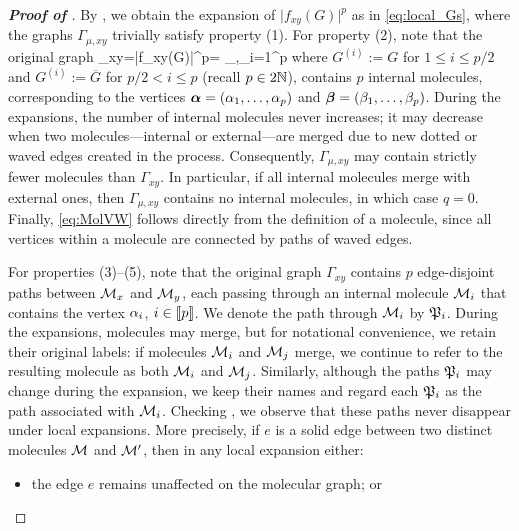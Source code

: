 \begin{proof}[\bf Proof of ]
By , we obtain the expansion of $\big|f_{xy}(G)\big|^{p}$ as in \eqref{eq:local_Gs}, where the graphs $\Gamma_{\mu,xy}$ trivially satisfy property (1). For property (2), note that the original graph 
\be\label{eq:originGamma}\Gamma_{xy}=\big|f_{xy}(G)\big|^{p}= \sum_{\bal,\bbeta}\prod_{i=1}^p \ee
where $G^{(i)}:=G$ for $1\le i\le p/2$ and $G^{(i)}:=\overline{G}$ for $p/2< i\le p$ (recall $p\in 2\N$), contains $p$ internal molecules, corresponding to the vertices $\bal=(\al_1,\ldots, \al_p)$ and $\bbeta=(\beta_1,\ldots, \beta_p)$. During the expansions, the number of internal molecules never increases; it may decrease when two molecules---internal or external---are merged due to new dotted or waved edges created in the process. Consequently, $\Gamma_{\mu,xy}$ may contain strictly fewer molecules than $\Gamma_{xy}$. In particular, if all internal molecules merge with external ones, then $\Gamma_{\mu,xy}$ contains no internal molecules, in which case $q=0$. Finally, \eqref{eq:MolVW} follows directly from the definition of a molecule, since all vertices within a molecule are connected by paths of waved edges. 

For properties (3)--(5), note that the original graph $\Gamma_{xy}$ contains $p$ edge-disjoint paths between $\Mol_x$ and $\Mol_y$, each passing through an internal molecule $\Mol_i$ that contains the vertex $\al_i$, $i\in \qqq{p}$. We denote the path through $\Mol_i$ by $\fP_i$.
During the expansions, molecules may merge, but for notational convenience, we retain their original labels: if molecules $\Mol_i$ and $\Mol_j$ merge, we continue to refer to the resulting molecule as both  $\Mol_i$ and $\Mol_j$. Similarly, although the paths $\fP_i$ may change during the expansion, we keep their names and regard each $\fP_i$ as the path associated with $\Mol_i$. 
Checking , we observe that these paths never disappear under local expansions. More precisely, if $e$ is a solid edge between two distinct molecules $\cal M$ and $\cal M'$, then in any local expansion either: 
\begin{itemize}
\item  the edge $e$ remains unaffected on the molecular graph; or %


\end{itemize}
\end{proof}
